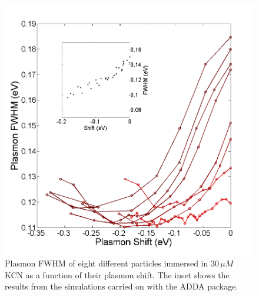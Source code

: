 \documentclass[twocolumn]{article}
\begin{document}
\begin{figure}[tp]
 \centering
 \includegraphics[width=0.95\linewidth]{fwhm_several_in_eV.png}
 \caption{Plasmon FWHM of eight different particles immersed in $30\,\mu M$ KCN
 as a function of their plasmon shift. The inset shows the results from the
 simulations carried on with the ADDA package.}
 \label{fig:FWHM}
\end{figure}
\end{document}
